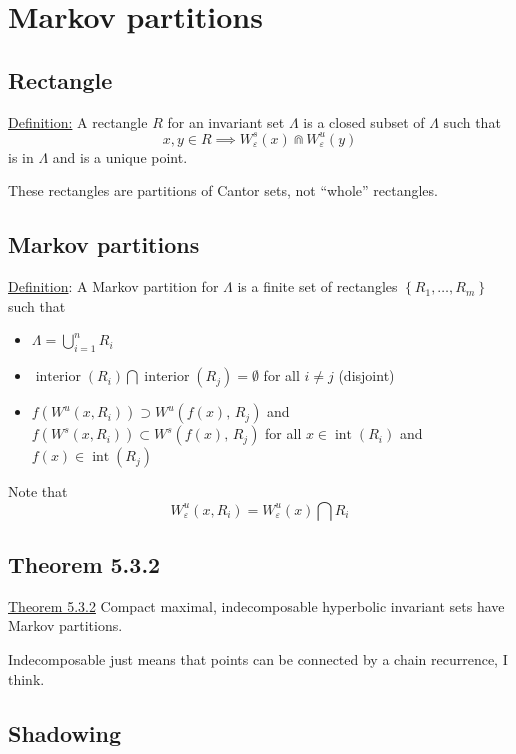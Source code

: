 \documentclass{article}
\begin{document}
\section{Markov partitions}

\subsection{Rectangle}

\underline{Definition:} A rectangle $R$ for an invariant set $\Lambda$ is a closed subset of $\Lambda$ such that 
\[
x,y\in R \implies W^s_\varepsilon(x) \Cap W^u_\varepsilon (y)
\]
is in $\Lambda$ and is a unique point.

These rectangles are partitions of Cantor sets, not ``whole'' rectangles.

\subsection{Markov partitions}

\underline{Definition}: A Markov partition for $\Lambda$ is a finite set of rectangles $\left\{R_1,\ldots, R_m\right\}$ such that 
\begin{itemize}
    \item $\Lambda = \bigcup^n_{i=1} R_i$
    \item $\operatorname{interior}\left(R_i\right)\bigcap \operatorname{interior}\left(R_j\right)= \emptyset$ for all $i\neq j$ (disjoint)
    \item $f\left(W^u\left(x, R_i\right)\right) \supset W^u\left(f(x),\, R_j\right) $ and $f\left(W^s\left(x, R_i\right)\right) \subset W^s\left(f(x),\, R_j\right) $ for all $x\in \operatorname{int}(R_i)$ and $f(x)\in \operatorname{int} (R_j)$
\end{itemize}
Note that 
\[
W^u_\varepsilon (x,R_i) = W^u_\varepsilon(x) \bigcap R_i
\]

\subsection{Theorem 5.3.2}

\underline{Theorem 5.3.2} Compact maximal, indecomposable hyperbolic invariant sets have Markov partitions.

Indecomposable just means that points can be connected by a chain recurrence, I think.

\subsection{Shadowing}
\end{document}
